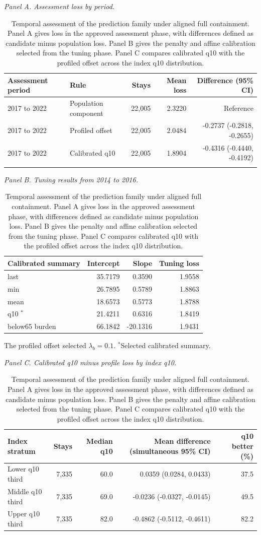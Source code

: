 \begin{table}[!htbp]
\caption{Temporal assessment of the prediction family under aligned full containment. Panel A gives loss in the approved assessment phase, with differences defined as candidate minus population loss. Panel B gives the penalty and affine calibration selected from the tuning phase. Panel C compares calibrated q10 with the profiled offset across the index q10 distribution.}
\label{tab:supp_temporal_validation}
\centering
\footnotesize
\textit{Panel A. Assessment loss by period.}\par\smallskip
\begin{tabular}{llrrr}
\toprule
Assessment period & Rule & Stays & Mean loss & Difference (95\% CI)\\
\midrule
2017 to 2022 & Population component & 22,005 & 2.3220 & Reference\\
2017 to 2022 & Profiled offset & 22,005 & 2.0484 & -0.2737 (-0.2818, -0.2655)\\
2017 to 2022 & Calibrated q10 & 22,005 & 1.8904 & -0.4316 (-0.4440, -0.4192)\\
\addlinespace
\bottomrule
\end{tabular}
\par\medskip
\textit{Panel B. Tuning results from 2014 to 2016.}\par\smallskip
\begin{tabular}{lrrr}
\toprule
Calibrated summary & Intercept & Slope & Tuning loss\\
\midrule
last & 35.7179 & 0.3590 & 1.9558\\
min & 26.7895 & 0.5789 & 1.8863\\
mean & 18.6573 & 0.5773 & 1.8788\\
q10 $^{*}$ & 21.4211 & 0.6316 & 1.8419\\
below65 burden & 66.1842 & -20.1316 & 1.9431\\
\bottomrule
\end{tabular}
\begin{flushleft}\footnotesize The profiled offset selected $\lambda_b=0.1$. $^{*}$Selected calibrated summary.\end{flushleft}
\par\medskip
\textit{Panel C. Calibrated q10 minus profile loss by index q10.}\par\smallskip
\begin{tabular}{lrrrr}
\toprule
Index stratum & Stays & Median q10 & Mean difference (simultaneous 95\% CI) & q10 better (\%)\\
\midrule
Lower q10 third & 7,335 & 60.0 & 0.0359 (0.0284, 0.0433) & 37.5\\
Middle q10 third & 7,335 & 69.0 & -0.0236 (-0.0327, -0.0145) & 49.5\\
Upper q10 third & 7,335 & 82.0 & -0.4862 (-0.5112, -0.4611) & 82.2\\
\bottomrule
\end{tabular}
\end{table}
